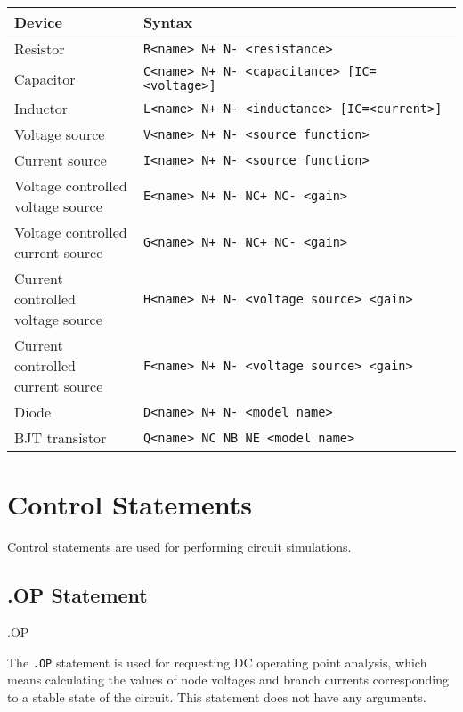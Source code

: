 \begin{center}
	\begin{tabular}{|l|l|}
		\hline
		Device & Syntax \\ 
		\hline \hline
		Resistor & \texttt{R<name> N+ N- <resistance>} \\ \hline
		Capacitor & \texttt{C<name> N+ N- <capacitance> [IC=<voltage>]} \\ \hline
		Inductor & \texttt{L<name> N+ N- <inductance> [IC=<current>]} \\ \hline
		Voltage source & \texttt{V<name> N+ N- <source function>} \\ \hline
		Current source & \texttt{I<name> N+ N- <source function>} \\ \hline
		\makecell[l]{Voltage controlled \\ voltage source} & \texttt{E<name> N+ N- NC+ NC- <gain>} \\ \hline
		\makecell[l]{Voltage controlled \\ current source} & \texttt{G<name> N+ N- NC+ NC- <gain>} \\ \hline
		\makecell[l]{Current controlled \\ voltage source} & \texttt{H<name> N+ N- <voltage source> <gain>} \\ \hline
		\makecell[l]{Current controlled \\ current source} & \texttt{F<name> N+ N- <voltage source> <gain>} \\ \hline
		Diode & \texttt{D<name> N+ N- <model name>} \\ \hline
		BJT transistor & \texttt{Q<name> NC NB NE <model name>} \\ \hline
	\end{tabular}
\end{center}

\newpage
\section{Control Statements}

Control statements are used for performing circuit simulations.

\subsection{.OP Statement}

\begin{code}
.OP
\end{code}

The \texttt{.OP} statement is used for requesting DC operating point analysis, which means calculating the values of node voltages and branch currents corresponding to a stable state of the circuit. This statement does not have any arguments.

